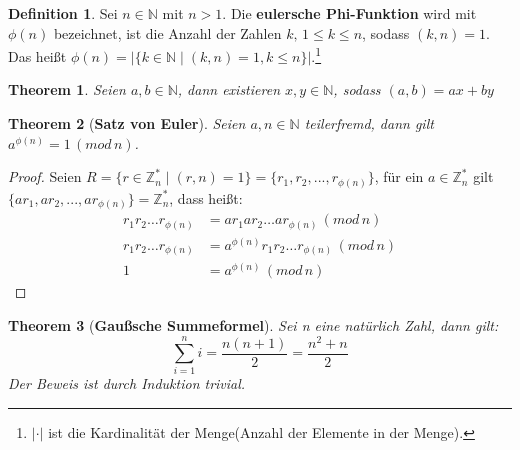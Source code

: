 \documentclass[12pt,oneside]{article}
\newtheorem{theorem}{Theorem}[section]
\theoremstyle{remark}
\theoremstyle{definition}
\newtheorem{definition}{Definition}[section]
\begin{document}
\smallskip


\begin{definition}\label{Df_6}
Sei $n \in \mathbb{N}$ mit $n > 1$. Die \textbf{eulersche Phi-Funktion} wird mit $\phi(n)$ bezeichnet, ist die Anzahl der Zahlen $k, \, 1 \leq k \leq n$, sodass $(k,n) = 1$. Das heißt $\phi(n) = |\{ k \in \mathbb{N} \mid (k,n) = 1, k \leq n \}|$.\footnote{$| \cdot |$ ist die Kardinalität der Menge(Anzahl der Elemente in der Menge).}
\end{definition}

\smallskip



\begin{theorem}
Seien $a,b \in \mathbb{N}$, dann existieren $x,y \in \mathbb{N}$, sodass $(a,b) = ax + by$ 
\end{theorem}

\smallskip

\begin{theorem}[\textbf{Satz von Euler}]\label{Th_1}
Seien $a,n \in \mathbb{N}$ teilerfremd, \newline dann gilt $a^{\phi(n)} = 1 \, (mod \, n) $.
\end{theorem}

\begin{proof}
    
Seien $R =\{ r \in \mathbb{Z}_{n}^{*} \mid (r,n) = 1 \} =  \{r_{1}, r_{2},...,r_{\phi(n)} \}$, für ein $a \in \mathbb{Z}_{n}^{*}$ gilt $\{ar_{1},ar_{2},...,ar_{\phi(n)}\} = \mathbb{Z}_{n}^{*}$, dass heißt:\newline\newline
\begin{align*}
    r_{1}r_{2} \dots r_{\phi(n)} &= ar_{1}ar_{2} \dots ar_{\phi(n)} \, (mod \, n)\\
    r_{1}r_{2} \dots r_{\phi(n)} &= a^{\phi(n)} r_{1}r_{2} \dots r_{\phi(n)} \, (mod \, n) \\
    1 &= a^{\phi(n)} \, (mod \, n)
\end{align*}

\end{proof}


\smallskip

\begin{theorem}[\textbf{Gaußsche Summeformel}]\label{gauss}
Sei n eine natürlich Zahl, dann gilt:
\begin{equation}
    \sum_{i = 1}^{n} i = \frac{n (n + 1)}{2} = \frac{n^2 + n}{2} 
\end{equation}
Der Beweis ist durch Induktion trivial.\newline\newline 
\end{theorem}
\end{document}
